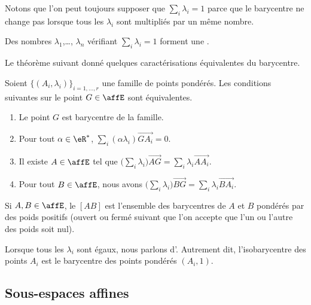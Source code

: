 Notons que l'on peut toujours supposer que \( \sum_i\lambda_i=1\) parce que le barycentre ne change pas lorsque tous les \( \lambda_i\) sont multipliés par un même nombre. 
\begin{definition}\label{DefIMZooLFdIUB}
    Des nombres \( \lambda_1\),\ldots, \( \lambda_n\) vérifiant \( \sum_i\lambda_i=1\) forment une .
\end{definition}

Le théorème suivant donné quelques caractérisations équivalentes du barycentre.
\begin{theorem}      \label{ThoIJVzxr}
    Soient \( \{ (A_i,\lambda_i) \}_{i=1,\ldots, r}\) une famille de points pondérés. Les conditions suivantes sur le point \( G\in \affE\) sont équivalentes.
    \begin{enumerate}
        \item
            Le point \( G\) est barycentre de la famille.
        \item
            Pour tout \( \alpha\in \eR^*\), \( \sum_i(\alpha\lambda_i)\overrightarrow{ GA_i }=0\).
        \item
            Il existe \( A\in\affE\) tel que \( \big( \sum_i\lambda_i \big)\overrightarrow{ AG }=\sum_i\lambda_i\overrightarrow{ AA_i }\).
        \item   \label{ItemEgOQBX}
            Pour tout \( B\in\affE\), nous avons \( \big( \sum_i\lambda_i \big)\overrightarrow{ BG }=\sum_i\lambda_i\overrightarrow{ BA_i }\).
    \end{enumerate}
\end{theorem}

\begin{definition}
    Si \( A,B\in \affE\), le  \( [AB]\) est l'ensemble des barycentres de \( A\) et \( B\) pondérés par des poids positifs (ouvert ou fermé suivant que l'on accepte que l'un ou l'autre des poids soit nul).
\end{definition}

Lorsque tous les \( \lambda_i\) sont égaux, nous parlons d'. Autrement dit, l'isobarycentre des points \( A_i\) est le barycentre des points pondérés \( (A_i,1)\).

\subsection{Sous-espaces affines}

